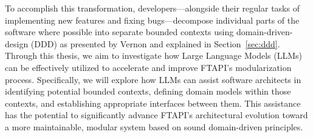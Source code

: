 To accomplish this transformation, developers—alongside their regular tasks of implementing new features and fixing bugs—decompose individual parts of the software where possible into separate bounded contexts using domain-driven-design (DDD) as presented by Vernon \autocite[p.62]{vernon2013implementing} and explained in Section~\ref{sec:ddd}. Through this thesis, we aim to investigate how Large Language Models (LLMs) can be effectively utilized to accelerate and improve FTAPI's modularization process. Specifically, we will explore how LLMs can assist software architects in identifying potential bounded contexts, defining domain models within those contexts, and establishing appropriate interfaces between them. This assistance has the potential to significantly advance FTAPI's architectural evolution toward a more maintainable, modular system based on sound domain-driven principles.
